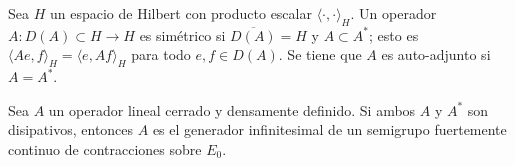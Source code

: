 \begin{Definicion}
    \label{ch:semigrupos:def:OpAutoAdj}
    Sea $H$ un espacio de Hilbert con producto escalar $\langle \cdot, \cdot \rangle_H$. Un operador $A : D(A) \subset H \rightarrow H$ es simétrico si $\overline{D(A)} = H$ y $A \subset A^*$; esto es $\langle Ae, f \rangle_H = \langle e, Af \rangle_H$ para todo $e,f \in D(A)$. Se tiene que $A$ es auto-adjunto si $A = A^*$.
\end{Definicion}


\begin{Corolario}
    \label{ch:semigrupos:cor:CorolarioLumerPhillips}
    Sea $A$ un operador lineal cerrado y densamente definido. Si ambos $A$ y $A^*$ son disipativos, entonces $A$ es el generador infinitesimal de un semigrupo fuertemente continuo de contracciones sobre $E_0$.
\end{Corolario}

